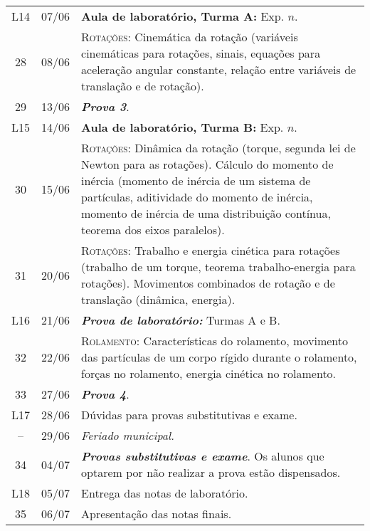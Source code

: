 \begin{center}
\begin{longtable}{ccp{70mm}}
L14  &  07/06    &  \textbf{Aula de laboratório, Turma A:} Exp. $n$. \\
28	 & 	08/06	 & 	\textsc{Rotações:} Cinemática da rotação (variáveis cinemáticas para rotações, sinais, equações para aceleração angular constante, relação entre variáveis de translação e de rotação). \\
29	 & 	13/06	 & 	\textbf{\textit{Prova 3}}. \\
L15  &  14/06    &  \textbf{Aula de laboratório, Turma B:} Exp. $n$. \\
30	 & 	15/06	 & 	\textsc{Rotações:} Dinâmica da rotação (torque, segunda lei de Newton para as rotações). Cálculo do momento de inércia (momento de inércia de um sistema de partículas, aditividade do momento de inércia, momento de inércia de uma distribuição contínua, teorema dos eixos paralelos). \\
31	 & 	20/06	 & 	\textsc{Rotações:} Trabalho e energia cinética para rotações (trabalho de um torque, teorema trabalho-energia para rotações). Movimentos combinados de rotação e de translação (dinâmica, energia).\\
	L16  &  21/06    &  \textbf{\textit{Prova de laboratório:}} Turmas A e B. \\
32	 & 	22/06	 & 	\textsc{Rolamento:} Características do rolamento, movimento das partículas de um corpo rígido durante o rolamento, forças no rolamento, energia cinética no rolamento. \\
33	 & 	27/06	 & 	\textbf{\textit{Prova 4}}. \\
L17  &  28/06    &  Dúvidas para provas substitutivas e exame. \\
--	 & 	29/06	 & 	\emph{Feriado municipal.} \\
34	 & 	04/07	 & 	\textbf{\textit{Provas substitutivas e exame}}. Os alunos que optarem por não realizar a prova estão dispensados. \\
L18  &  05/07    &  Entrega das notas de laboratório. \\
35	 & 	06/07	 & 	Apresentação das notas finais. \\
\end{longtable}
\end{center}

\cleardoublepage


